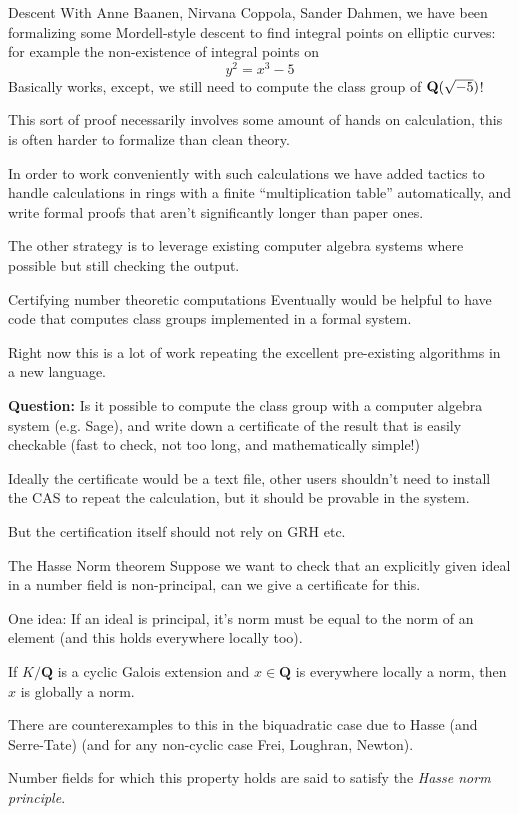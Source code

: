 \begin{frame}{Descent}
    With Anne Baanen, Nirvana Coppola, Sander Dahmen, we have been formalizing some Mordell-style descent to find integral points on elliptic curves: for example the non-existence of integral points on
    $$y^2 = x^3 - 5$$\pause
    Basically works, except, we still need to compute the class group of $\mathbf Q(\sqrt{-5})$!

    This sort of proof necessarily involves some amount of hands on calculation, this is often harder to formalize than clean theory. %

    In order to work conveniently with such calculations we have added tactics to handle calculations in rings with a finite ``multiplication table'' automatically, and write formal proofs that aren't significantly longer than paper ones.

    The other strategy is to leverage existing computer algebra systems where possible but still checking the output.
\end{frame}

\begin{frame}{Certifying number theoretic computations}
    Eventually would be helpful to have code that computes class groups implemented in a formal system.

    Right now this is a lot of work repeating the excellent pre-existing algorithms in a new language.  \pause

    \textbf{Question:} Is it possible to compute the class group with a computer algebra system (e.g. Sage), and write down a certificate of the result that is easily checkable (fast to check, not too long, and mathematically simple!)

    Ideally the certificate would be a text file, other users shouldn't need to install the CAS to repeat the calculation, but it should be provable in the system.

    But the certification itself should not rely on GRH etc.
\end{frame}

\begin{frame}{The Hasse Norm theorem}
    Suppose we want to check that an explicitly given ideal in a number field is non-principal, can we give a certificate for this.

    One idea: If an ideal is principal, it's norm must be equal to the norm of an element (and this holds everywhere locally too).

    \begin{theorem}
        If $K/\mathbf Q$ is a cyclic Galois extension and $x \in \mathbf Q$ is everywhere locally a norm, then $x$ is globally a norm.
    \end{theorem}
\pause
    There are counterexamples to this in the biquadratic case due to Hasse (and Serre-Tate) (and for any non-cyclic case Frei, Loughran, Newton).

    Number fields for which this property holds are said to satisfy the \emph{Hasse norm principle}.
\end{frame}


